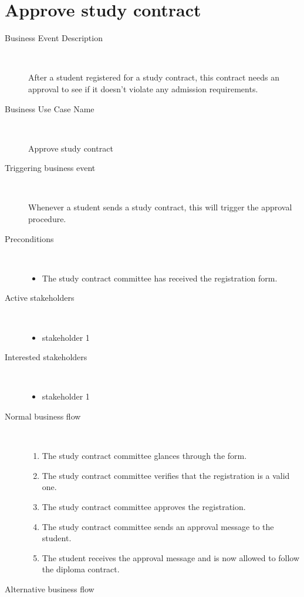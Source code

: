\section{Approve study contract}

\begin{description}
	\item[Business Event Description] \ 
		\par After a student registered for a study contract, this contract needs an
		approval to see if it doesn't violate any admission requirements.
	\item[Business Use Case Name] \ 
		\par Approve study contract
	\item[Triggering business event] \ 
		\par Whenever a student sends a study contract, this will trigger the
		approval procedure.
	\item[Preconditions] \
	\begin{itemize}
		\item The study contract committee has received the registration form.
	\end{itemize}
	\item[Active stakeholders] \ 
	\begin{itemize}
		\item stakeholder 1
	\end{itemize}
	\item[Interested stakeholders] \ 
		\begin{itemize}
		\item stakeholder 1
		\end{itemize}
	\item[Normal business flow] \ 
	\begin{enumerate}
	  	\item The study contract committee glances through the form. 
	  	\item The study contract committee verifies that the registration is a valid
	  	one.
	  	\item The study contract committee approves the registration.
	  	\item The study contract committee sends an approval message to the
	  	student.
	  	\item The student receives the approval message and is now allowed to follow
	  	the diploma contract.
	\end{enumerate}
	\item[Alternative business flow] \

\end{description}
